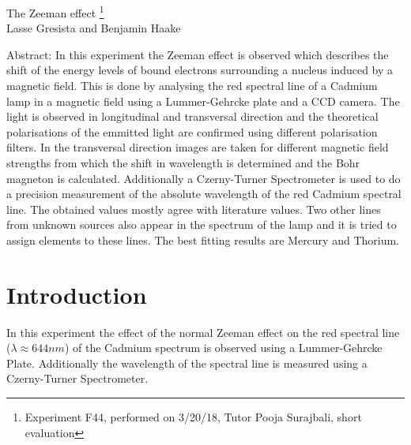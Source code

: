 \documentclass[12pt]{article}
\begin{document}
\thispagestyle{empty}     %
\null
\vspace{40mm}
\begin{center}
{%
\Large  The Zeeman effect
\footnote{\noindent Experiment F44, performed on 3/20/18, Tutor Pooja Surajbali, short evaluation}}\\[15mm]
Lasse Gresista and Benjamin Haake

\vspace{25mm}

\parbox{0.9\textwidth}{   %
Abstract:    
\small In this experiment the Zeeman effect is observed which describes the shift of the energy levels of bound electrons surrounding a nucleus induced by a magnetic field. This is done by analysing the red spectral line of a Cadmium lamp in a magnetic field using a Lummer-Gehrcke plate and a CCD camera. The light is observed in longitudinal and transversal direction and the theoretical polarisations of the emmitted light are confirmed using different polarisation filters. In the transversal direction images are taken for different magnetic field strengths from which the shift in wavelength is determined and the Bohr magneton is calculated. Additionally a Czerny-Turner Spectrometer is used to do a precision measurement of the absolute wavelength of the red Cadmium spectral line. The obtained values mostly agree with literature values. Two other lines from unknown sources also appear in the spectrum of the lamp and it is tried to assign elements to these lines. The best fitting results are Mercury and Thorium. 
}
\end{center}

\vfill
\vspace{20mm}


\newpage
{}

\section{Introduction}
In this experiment the effect of the normal Zeeman effect on the red spectral line ($\lambda\approx644nm$) of the Cadmium spectrum is observed using a Lummer-Gehrcke Plate. Additionally the wavelength of the spectral line is measured using a Czerny-Turner Spectrometer. 
\end{document}
